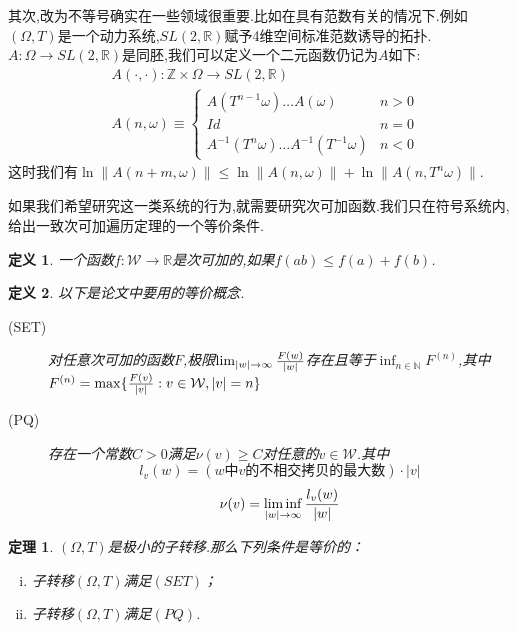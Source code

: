 \documentclass[a4paper,11pt,oneside]{book}
\newtheorem{theorem}{\textbf{\hspace{0.7cm}定理}}[section]
\newtheorem{definition}{\textbf{\hspace{0.7cm}定义}}[section]
\begin{document}
其次,改为不等号确实在一些领域很重要.比如在具有范数有关的情况下.例如$(\Omega,T)$是一个动力系统,$SL(2,\mathbb{R})$赋予4维空间标准范数诱导的拓扑.$A:\Omega\rightarrow SL(2,\mathbb{R})$是同胚,我们可以定义一个二元函数仍记为$A$如下:
\begin{align*}
&A(\cdot,\cdot):\mathbb{Z}\times\Omega\rightarrow SL(2,\mathbb{R})\\
&A(n,\omega)\equiv
\begin{cases}
A(T^{n-1}\omega)\ldots A(\omega)&n>0\\
Id &n=0\\
A^{-1}(T^n\omega)\ldots A^{-1}(T^{-1}\omega) &n<0
\end{cases}
\end{align*}
这时我们有$\ln\|A(n+m,\omega)\|\leq \ln\|A(n,\omega)\|+\ln\|A(n,T^n\omega)\|$.

如果我们希望研究这一类系统的行为,就需要研究次可加函数.我们只在符号系统内,给出一致次可加遍历定理的一个等价条件.
\begin{definition}
一个函数$f:\mathcal{W}\rightarrow \mathbb{R}$是次可加的,如果$f(ab)\leq f(a)+f(b)$.
\end{definition}

\begin{definition}
以下是论文中要用的等价概念.
\begin{description}
\item[(SET)] 对任意次可加的函数$F$,极限$\lim_{|w|\to \infty}{F(w)\over |w|}$存在且等于$\inf_{n\in \mathbb{N}}F^{(n)}$,其中$F^{(n)}=\max\{{F(v)\over |v|}:v\in\mathcal{W},|v|=n\}$
\item[(PQ)] 存在一个常数$C>0$满足$\nu(v)\geq C$对任意的$v\in \mathcal{W}$.其中
$$l_v(w)=(w\text{中}v\text{的不相交拷贝的最大数})\cdot |v|$$
$$\nu(v)=\liminf_{|w|\to \infty}{l_v(w)\over |w|}$$
\end{description}
\end{definition}
\begin{theorem}
$(\Omega,T)$是极小的子转移.那么下列条件是等价的：
\begin{enumerate}[(i)]
\item 子转移$(\Omega,T)$满足$(SET)$；
\item 子转移$(\Omega,T)$满足$(PQ)$.
\end{enumerate}
\end{theorem}
\end{document}
